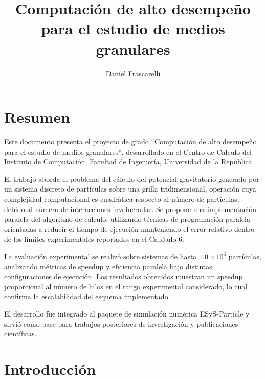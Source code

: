 \documentclass[a4paper,11pt]{book}
\title{Computación de alto desempeño para el estudio de medios granulares}
\author{Daniel Frascarelli}
\date{}
\begin{document}
\maketitle

\pagestyle{fancy}
\renewcommand{\chaptermark}[1]{\markboth{\chaptername\ \thechapter.\ #1}{}}
\renewcommand{\sectionmark}[1]{\markright{#1}}
\lhead[\fancyplain{}{\bfseries\thepage}]{\fancyplain{}{\bfseries\rightmark}}
\rhead[\fancyplain{}{\bfseries\leftmark}]{\fancyplain{}{\bfseries\thepage}}
\cfoot{}

\renewcommand{\listtablename}{Índice de tablas}
\renewcommand{\tablename}{Tabla}

\chapter*{Resumen}

Este documento presenta el proyecto de grado ``Computación de alto desempeño para el estudio de medios granulares'', desarrollado en el Centro de Cálculo del Instituto de Computación, Facultad de Ingeniería, Universidad de la República.

El trabajo aborda el problema del cálculo del potencial gravitatorio generado por un sistema discreto de partículas sobre una grilla tridimensional, operación cuya complejidad computacional es cuadrática respecto al número de partículas, debido al número de interacciones involucradas. Se propone una implementación paralela del algoritmo de cálculo, utilizando técnicas de programación paralela orientadas a reducir el tiempo de ejecución manteniendo el error relativo dentro de los límites experimentales reportados en el Capítulo 6.

La evaluación experimental se realizó sobre sistemas de hasta $1.0\times10^{6}$ partículas, analizando métricas de speedup y eficiencia paralela bajo distintas configuraciones de ejecución. Los resultados obtenidos muestran un speedup proporcional al número de hilos en el rango experimental considerado, lo cual confirma la escalabilidad del esquema implementado.

El desarrollo fue integrado al paquete de simulación numérica ESyS-Particle y sirvió como base para trabajos posteriores de investigación y publicaciones científicas.


\tableofcontents

\chapter{Introducción}
\end{document}
